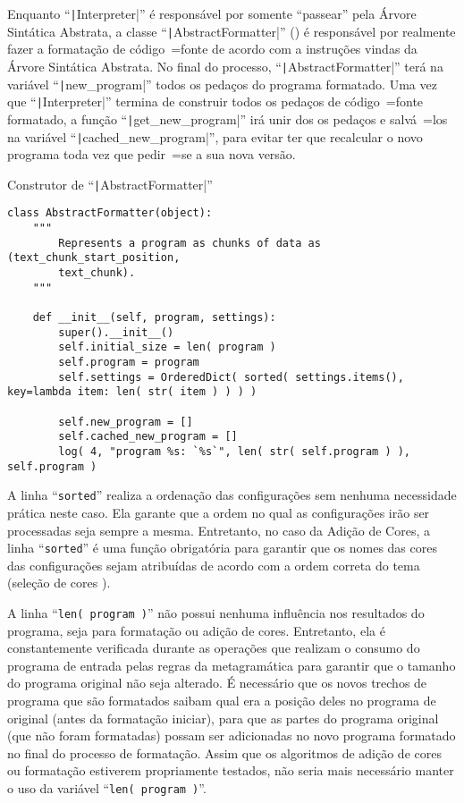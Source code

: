 Enquanto ``\texttt|Interpreter|'' é responsável por somente ``passear'' pela Árvore Sintática Abstrata,
a classe ``\texttt|AbstractFormatter|'' () é responsável por realmente fazer a formatação de código~=fonte de acordo com a instruções vindas da Árvore Sintática Abstrata.
No final do processo,
``\texttt|AbstractFormatter|'' terá na variável ``\texttt|new_program|'' todos os pedaços do programa formatado.
Uma vez que ``\texttt|Interpreter|'' termina de construir todos os pedaços de código~=fonte formatado,
a função ``\texttt|get_new_program|'' irá unir dos os pedaços e
salvá~=los na variável ``\texttt|cached_new_program|'',
para evitar ter que recalcular o novo programa toda vez que pedir~=se a sua nova versão.
\begin{code}
\caption{Construtor de ``\texttt|AbstractFormatter|''}
\label{code:construtorDeParsedProgram}
\begin{verbatim}
class AbstractFormatter(object):
    """
        Represents a program as chunks of data as (text_chunk_start_position,
        text_chunk).
    """

    def __init__(self, program, settings):
        super().__init__()
        self.initial_size = len( program )
        self.program = program
        self.settings = OrderedDict( sorted( settings.items(), key=lambda item: len( str( item ) ) ) )

        self.new_program = []
        self.cached_new_program = []
        log( 4, "program %s: `%s`", len( str( self.program ) ), self.program )
\end{verbatim}
\end{code}

A linha ``\texttt{sorted}'' realiza a ordenação das configurações sem nenhuma necessidade prática neste caso.
Ela garante que a ordem no qual as configurações irão ser processadas seja sempre a mesma.
Entretanto,
no caso da Adição de Cores,
a linha ``\texttt{sorted}'' é uma função obrigatória para garantir que os nomes das cores das configurações sejam atribuídas de acordo com a ordem correta do tema (seleção de cores \cite{vsCodeSyntaxHighlighthing,sublimeTextScopeNaming}).

A linha ``\texttt{len( program )}'' não possui nenhuma influência nos resultados do programa,
seja para formatação ou
adição de cores.
Entretanto,
ela é constantemente verificada durante as operações que realizam o consumo do programa de entrada pelas regras da metagramática para garantir que o tamanho do programa original não seja alterado.
É necessário que os novos trechos de programa que são formatados saibam qual era a posição deles no programa de original (antes da formatação iniciar),
para que as partes do programa original (que não foram formatadas) possam ser adicionadas no novo programa formatado no final do processo de formatação.
Assim que os algoritmos de adição de cores ou
formatação estiverem propriamente testados,
não seria mais necessário manter o uso da variável ``\texttt{len( program )}''.

